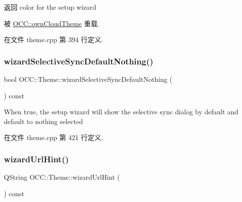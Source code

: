 \begin{DoxyReturn}{返回}
color for the setup wizard 
\end{DoxyReturn}


被 \hyperlink{class_o_c_c_1_1own_cloud_theme_a7eb765922b1798d364003d1c9328c65e}{O\+C\+C\+::own\+Cloud\+Theme} 重载.



在文件 theme.\+cpp 第 394 行定义.

\mbox{\label{class_o_c_c_1_1_theme_ab07bddac0c6491210c81ec4d8f132f73}} 
\subsubsection{\texorpdfstring{wizard\+Selective\+Sync\+Default\+Nothing()}{wizardSelectiveSyncDefaultNothing()}}
{\footnotesize\ttfamily bool O\+C\+C\+::\+Theme\+::wizard\+Selective\+Sync\+Default\+Nothing (\begin{DoxyParamCaption}{ }\end{DoxyParamCaption}) const\hspace{0.3cm}{\ttfamily [virtual]}}

When true, the setup wizard will show the selective sync dialog by default and default to nothing selected 

在文件 theme.\+cpp 第 421 行定义.

\mbox{\label{class_o_c_c_1_1_theme_a4e652a4d0881175b41218c58e5ca8e85}} 
\subsubsection{\texorpdfstring{wizard\+Url\+Hint()}{wizardUrlHint()}}
{\footnotesize\ttfamily Q\+String O\+C\+C\+::\+Theme\+::wizard\+Url\+Hint (\begin{DoxyParamCaption}{ }\end{DoxyParamCaption}) const\hspace{0.3cm}{\ttfamily [virtual]}}



